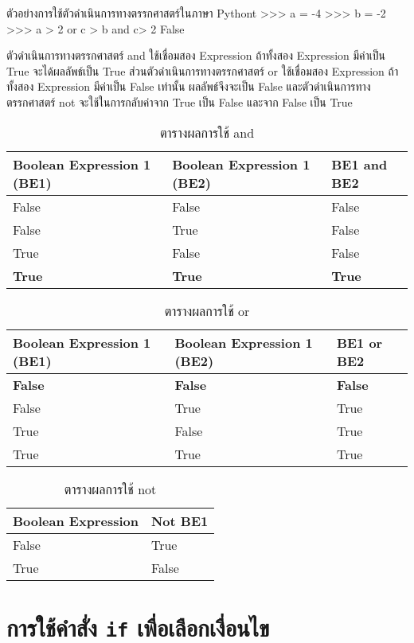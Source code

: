 \begin{codelist}{ตัวอย่างการใช้ตัวดำเนินการทางตรรกศาสตร์ในภาษา Pythont}{}
>>> a = -4
>>> b = -2
>>> a > 2 or c > b and c> 2
False
\end{codelist}

ตัวดำเนินการทางตรรกศาสตร์  and ใช้เชื่อมสอง Expression ถ้าทั้งสอง Expression มีค่าเป็น True จะได้ผลลัพธ์เป็น True  ส่วนตัวดำเนินการทางตรรกศาสตร์ or ใช้เชื่อมสอง Expression ถ้าทั้งสอง Expression มีค่าเป็น False เท่านั้น ผลลัพธ์จึงจะเป็น False และตัวดำเนินการทางตรรกศาสตร์ not จะใช้ในการกลับค่าจาก True เป็น False และจาก False เป็น True

\begin{table}
\caption{ตารางผลการใช้ and}
\centering
\begin{tabu}{l l l}
 \hline
Boolean Expression 1 (BE1) & Boolean Expression 1 (BE2) & BE1 and BE2  \\ [0.5ex] 
 \hline
False & False & False \\
False & True & False  \\
True & False & False \\
\textbf{True} & \textbf{True} & \textbf{True} \\
\end{tabu}
\end{table}

\begin{table}
\caption{ตารางผลการใช้ or}
\centering
\begin{tabu}{l l l}
 \hline
Boolean Expression 1 (BE1) & Boolean Expression 1 (BE2) & BE1 or BE2  \\ [0.5ex] 
 \hline
\textbf{False} & \textbf{False} & \textbf{False} \\
False & True & True  \\
True & False & True \\
True & True & True \\
\end{tabu}
\end{table}

\begin{table}
\caption{ตารางผลการใช้ not}
\centering
\begin{tabu}{l l}
 \hline
 Boolean Expression & Not BE1  \\ [0.5ex] 
 \hline
False & True \\
True & False \\
\end{tabu}
\end{table}

\section{การใช้คำสั่ง \texttt{if} เพื่อเลือกเงื่อนไข}

